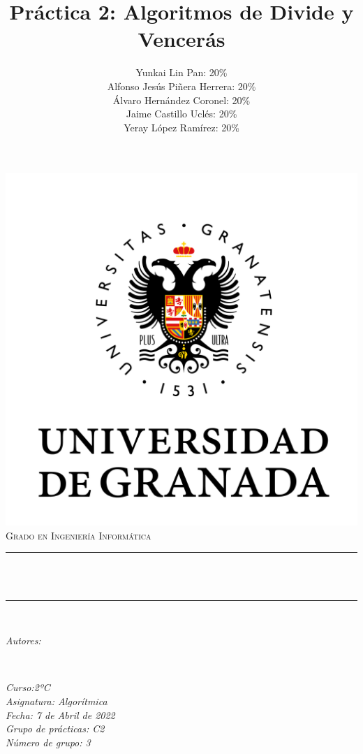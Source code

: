 \documentclass[12pt, spanish]{article}
\title{Práctica 2: Algoritmos de Divide y Vencerás \hspace{0.05cm} }
\date{}
\author{
Yunkai Lin Pan: 20\% \\
Alfonso Jesús Piñera Herrera: 20\% \\
Álvaro Hernández Coronel: 20\%  \\
Jaime Castillo Uclés: 20\% \\
Yeray López Ramírez: 20\% \\
}
\makeatletter
\let\thetitle\@title
\let\theauthor\@author
\makeatother
\begin{document}
\begin{titlepage}
  \centering
  \vspace*{0.5 cm}
  \includegraphics[scale = 0.50]{ugr.png}\\[1.0 cm]
  \textsc{\huge Grado en Ingeniería Informática}\\[0.5 cm]
  \rule{\linewidth}{0.2 mm} \\[0.4 cm]
  { \huge \bfseries \thetitle}\\
  \rule{\linewidth}{0.2 mm} \\[1.5 cm]
  
  \begin{minipage}{0.4\textwidth}
    \begin{flushleft} \large
        \emph{Autores:}\\

        \small \theauthor
        \end{flushleft}
        \end{minipage}~
        \begin{minipage}{0.4\textwidth}
        \begin{flushright} \large
        \emph{Curso:2ºC \\
        Asignatura: Algorítmica \\
        Fecha: 7 de Abril de 2022 \\
        Grupo de prácticas: C2 \\
        Número de grupo: 3}
    \end{flushright}
\end{minipage}\\[1 cm]


\vfill
  
\end{titlepage}
\end{document}
